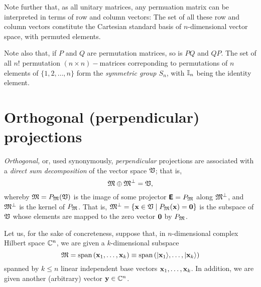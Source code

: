 Note further that, as all unitary matrices, any permuation matrix can be interpreted in terms of row and column vectors:
The set of all these row and column vectors constitute the Cartesian standard basis of $n$-dimensional vector space,
with permuted elements.

Note also that, if $P$ and $Q$ are permutation matrices, so is $PQ$ and $QP$.
The set of all $n!$
permutation $(n\times n)-$matrices correponding to permutations of $n$ elements of $\{ 1,2,\ldots ,n\}$ form the
{\em symmetric group $S_n$}, with ${\Bbb I}_n$ being the identity element.





\section{Orthogonal (perpendicular) projections}

{\em Orthogonal,} or, used synonymously,
{\em perpendicular} projections
are associated with a {\em direct sum decomposition} of the vector space ${\frak V}$;
that is,
\begin{equation}
 {\frak M}\oplus {\frak M}^\perp ={\frak V},
\label{2012-m-ch-fdvs-perp}
\end{equation}
whereby $ {\frak M}= P_{\frak M}({\frak V})$
is the image of some projector $\textsf{\textbf{E}}=P_{\frak M}$
along ${\frak M}^\perp$, and  ${\frak M}^\perp$ is
the kernel of $P_{\frak M}$.
That is, ${\frak M}^\perp = \left\{{\bf x} \in {\frak V} \mid P_{\frak M}({\bf x}) = {\bf 0}\right\}$
is the subspace of ${\frak V}$
whose elements are mapped to the zero vector ${\bf 0}$ by $P_{\frak M}$.


Let us, for the sake of concreteness,
suppose that, in $n$-dimensional complex Hilbert space
${\Bbb C}^n$, we are given a $k$-dimensional subspace
\begin{equation}
{\frak M} = \textrm{span}\left( {\bf x}_1,\ldots ,{\bf x}_k \right)
\equiv \textrm{span}\left(\vert {\bf x}_1\rangle ,\ldots ,\vert {\bf x}_k \right\rangle )
\end{equation}
spanned
by  $k \le n$  linear independent base vectors ${\bf x}_1,\ldots ,{\bf x}_k$.
In addition, we are given another (arbitrary) vector ${\bf y} \in {\Bbb C}^n$.

